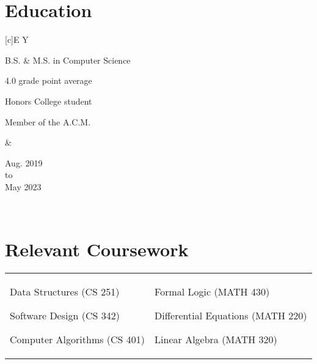 \documentclass[10.5pt, letterpaper]{article}
\newenvironment{Education} %
{                          %
	\section*{Education}   %
	\flushleft             %
}{                         %
	\endflushleft          %
}
\newenvironment{TitleDescription}[1]                    %
{                                                       %
	\begin{description}                                 %
		\item [#1]                                      %
		\let\realitem\item                              %
		\renewcommand{\item}[1]{\let\item\realitem ##1} %
}{                                                      %
	\end{description}                                   %
}
\newenvironment{EdEntry}[3]                 %
{                                           %
	\newcommand{\DateLine}{#2 \\ to \\ #3}  %
	\tabularx{\textwidth}[c]{E Y}           %
		\begin{multicols}{2}                %
			\begin{TitleDescription}{#1}    %
}{                                          %
			\end{TitleDescription}          %
		\end{multicols}                     %
		&                                   %
		\begin{center}\DateLine\end{center} %
		\\                                  %
	\endtabularx                            %
}
\begin{document}

\begin{Education}
	\begin{EdEntry}{University of Illinois at Chicago, Chicago, Il.}{Aug. 2019}{May 2023}
		\item B.S. \& M.S. in Computer Science 
		\item 4.0 grade point average
		\item Honors College student
		\item Member of the A.C.M.
	\end{EdEntry}
\end{Education}

\section*{Relevant Coursework}

\begin{flushleft}
	\begin{tabularx}{\textwidth}[c]{X X}
		\begin{description}
			\item Data Structures (CS 251)
			\item Software Design (CS 342)
			\item Computer Algorithms (CS 401)
		\end{description} &
		\begin{description}
			\item Formal Logic (MATH 430)
			\item Differential Equations (MATH 220)
			\item Linear Algebra (MATH 320)
		\end{description}
	\end{tabularx}
\end{flushleft}

\end{document}
